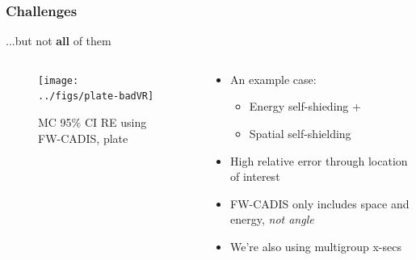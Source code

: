 \documentclass[xcolor=x11names,compress, handout]{beamer}
\renewcommand{\(}{\begin{columns}}
\renewcommand{\)}{\end{columns}}
\newcommand{\<}[1]{\begin{column}{#1}}
\renewcommand{\>}{\end{column}}
\begin{document}
\begin{frame}[fragile]
  \frametitle{Challenges}

	...but not \textbf{all} of them
	\begin{columns}
  	\begin{column}{0.45\textwidth}
  	\begin{center}
  	\begin{figure}
  		\texttt{[image: ../figs/plate-badVR]}
  		\caption{MC 95\% CI RE using FW-CADIS, plate \cite{Wilson2015}}
  	\end{figure}
	\end{center}
  	\end{column}
 	\begin{column}{0.5\textwidth}
  	\begin{center}
  	\begin{itemize}
  		\item An example case: 
		\begin{itemize}
		    \item Energy self-shieding + 
		    \item Spatial self-shielding
		\end{itemize}
		\item High relative error through location of interest \vspace*{0.5 em}
		\pause
		\item FW-CADIS only includes space and energy, \textit{not angle} \vspace*{0.5 em}
		\pause
		\item We're also using multigroup x-secs
	\end{itemize}
  	\end{center}
  	\end{column}
	\end{columns}

\end{frame}


\end{document}
